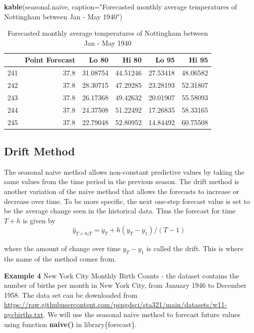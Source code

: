 \documentclass[
]{book}
\newenvironment{Shaded}{\begin{snugshade}}{\end{snugshade}}
\newcommand{\AttributeTok}[1]{\textcolor[rgb]{0.13,0.29,0.53}{#1}}
\newcommand{\FunctionTok}[1]{\textcolor[rgb]{0.13,0.29,0.53}{\textbf{#1}}}
\newcommand{\NormalTok}[1]{#1}
\newcommand{\StringTok}[1]{\textcolor[rgb]{0.31,0.60,0.02}{#1}}
\begin{document}
\begin{Shaded}
\begin{Highlighting}[]
\FunctionTok{kable}\NormalTok{(seasonal.naive, }\AttributeTok{caption=}\StringTok{"Forecasted monthly average temperatures of Nottingham between Jan {-} May 1940"}\NormalTok{)}
\end{Highlighting}
\end{Shaded}

\begin{table}

\caption{\label{tab:unnamed-chunk-200}Forecasted monthly average temperatures of Nottingham between Jan - May 1940}
\centering
\begin{tabular}[t]{l|r|r|r|r|r}
\hline
  & Point Forecast & Lo 80 & Hi 80 & Lo 95 & Hi 95\\
\hline
241 & 37.8 & 31.08754 & 44.51246 & 27.53418 & 48.06582\\
\hline
242 & 37.8 & 28.30715 & 47.29285 & 23.28193 & 52.31807\\
\hline
243 & 37.8 & 26.17368 & 49.42632 & 20.01907 & 55.58093\\
\hline
244 & 37.8 & 24.37508 & 51.22492 & 17.26835 & 58.33165\\
\hline
245 & 37.8 & 22.79048 & 52.80952 & 14.84492 & 60.75508\\
\hline
\end{tabular}
\end{table}

\hypertarget{drift-method}{%
\subsection{Drift Method}\label{drift-method}}

The seasonal naive method allows non-constant predictive values by taking the same values from the time period in the previous season. The drift method is another variation of the naive method that allows the forecasts to increase or decrease over time. To be more specific, the next one-step forecast value is set to be the average change seen in the historical data. Thus the forecast for time \(T + h\) is given by \[\hat{y}_{T+h|T} = y_T +h(y_T-y_1)/(T-1)\]

where the amount of change over time \(y_T-y_1\) is called the drift. This is where the name of the method comes from.

\textbf{Example 4} New York City Monthly Birth Counts - the dataset contains the number of births per month in New York City, from January 1946 to December 1958. The data set can be downloaded from \url{https://raw.githubusercontent.com/pengdsci/sta321/main/datasets/w11-nycbirths.txt}. We will use the seasonal naive method to forecast future values using function \textbf{naive()} in library\{forecast\}.
\end{document}
